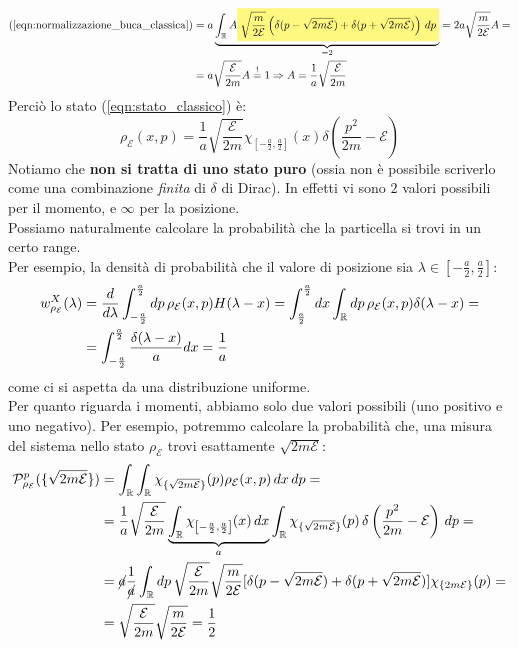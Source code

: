 \documentclass[../../FisicaTeorica.tex]{subfiles}
\begin{document}
\begin{align*}
(\ref{eqn:normalizzazione_buca_classica}) &= a\underbrace{\int_\bb{R} A
\hlc{Yellow}{
\sqrt{\frac{m}{2\mathcal{E}}}\left(
\delta(p-\sqrt{2m\mathcal{E}})+\delta(p+\sqrt{2m\mathcal{E}})
\right)\,dp 
}
}_{=2} = 2a\sqrt{\frac{m}{2\mathcal{E}}}A =\\
&= a\sqrt{\frac{\mathcal{E}}{2m}}A\overset{!}{=}1\Rightarrow A=\frac{1}{a}\sqrt{\frac{\mathcal{E}}{2m}}
\end{align*}
Perciò lo stato (\ref{eqn:stato_classico}) è:
\[
\rho_\mathcal{E}(x,p)=\frac{1}{a} \sqrt{\frac{\mathcal{E}}{2m}}\chi_{\left[-\frac{a}{2},\frac{a}{2}\right]}(x)\delta\left(\frac{p^2}{2m}-\mathcal{E}\right)
\]
Notiamo che \textbf{non si tratta di uno stato puro} (ossia non è possibile scriverlo come una combinazione \textit{finita} di $\delta$ di Dirac). In effetti vi sono $2$ valori possibili per il momento, e $\infty$ per la posizione.\\

Possiamo naturalmente calcolare la probabilità che la particella si trovi in un certo range.\\
Per esempio, la densità di probabilità che il valore di posizione sia $\lambda \in \left[-\frac{a}{2},\frac{a}{2}\right]$:
\begin{align*}
w^X_{\rho_\mathcal{E}}(\lambda) &= \frac{d}{d\lambda}\int_{-\frac{a}{2}}^{\frac{a}{2}} dp\,\rho_\mathcal{E}(x,p)H(\lambda-x)= \int_{\frac{a}{2}}^{\frac{a}{2}} dx \int_{\mathbb{R}} dp\, \rho_\mathcal{E}(x,p)\delta(\lambda-x)=\\
&=\int_{-\frac{a}{2}}^{\frac{a}{2}} \frac{\delta(\lambda-x)}{a}dx = \frac{1}{a}
\end{align*}
come ci si aspetta da una distribuzione uniforme.\\
Per quanto riguarda i momenti, abbiamo solo due valori possibili (uno positivo e uno negativo). Per esempio, potremmo calcolare la probabilità che, una misura del sistema nello stato  $\rho_{\mathcal{E}}$ trovi esattamente $\sqrt{2m\mathcal{E}}$:
\begin{align*}
\mathcal{P}^p_{\rho_\mathcal{E}}(\{\sqrt{2m\mathcal{E}}\})&=\int_{\mathbb{R}} \int_{\mathbb{R}} \chi_{\{\sqrt{2m\mathcal{E}}\}}(p) \rho_\mathcal{E}(x,p)\,dx\,dp = \\
& =
\frac{1}{a}\sqrt{\frac{\mathcal{E}}{2m}}
\underbrace{\int_{\mathbb{R}} 
\chi_{\left[-\frac{a}{2},\frac{a}{2}\right]}(x)\,dx}_{a}
\int_{\mathbb{R}} \chi_{\{\sqrt{2m\mathcal{E}}\}}(p)\, \delta\left(\frac{p^2}{2m}-\mathcal{E}\right)\,dp = \\
&= \cancel{a} \frac{1}{\cancel{a}}\int_{\mathbb{R}} dp\,\sqrt{\frac{\mathcal{E}}{2m}} \sqrt{\frac{m}{2\mathcal{E}}}[
\delta(p-\sqrt{2m\mathcal{E}})+\delta(p+\sqrt{2m\mathcal{E}})]\chi_{\{2m\mathcal{E}\}}(p) =\\
&= \sqrt{\frac{\mathcal{E}}{2m}}\sqrt{\frac{m}{2\mathcal{E}}} = \frac{1}{2}
\end{align*}
\end{document}
